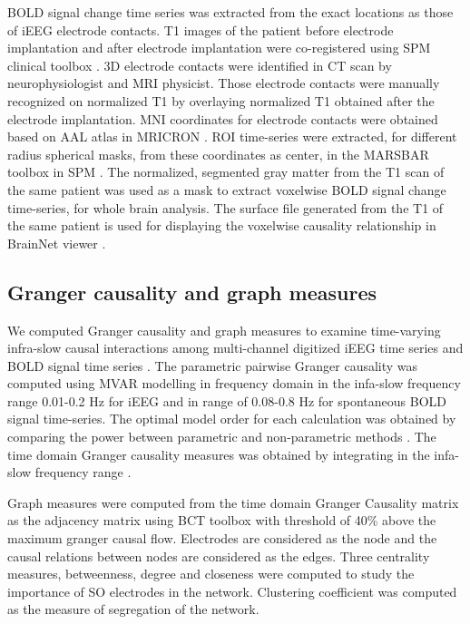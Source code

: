 BOLD signal change time series was extracted from the exact locations as those of iEEG electrode contacts. T1 images of the patient before electrode implantation and after electrode implantation were co-registered using SPM clinical toolbox \citep{rorden2012age}. 3D electrode contacts were identified in CT scan by neurophysiologist and MRI physicist. Those electrode contacts were manually recognized on normalized T1 by overlaying normalized T1 obtained after the electrode implantation. MNI coordinates for electrode contacts were obtained based on AAL atlas in MRICRON  \citep{rorden2000stereotaxic}. ROI time-series were extracted, for different radius spherical masks, from these coordinates as center, in the MARSBAR toolbox in SPM \citep{eickhoff2005new}. The normalized, segmented gray matter from the T1 scan of the same patient was used as a mask to extract voxelwise BOLD signal change time-series, for whole brain analysis. The surface file generated from the T1 of the same patient is used for displaying the voxelwise causality relationship in BrainNet viewer \citep{xia2013brainnet}.

\subsection{Granger causality and graph measures}
We computed Granger causality and graph measures to examine time-varying infra-slow causal interactions among multi-channel digitized iEEG time series and BOLD signal time series \citep{dhamala2008analyzing}. The parametric pairwise Granger causality was computed using MVAR modelling in frequency domain in the infa-slow frequency range 0.01-0.2 Hz for iEEG and in range of 0.08-0.8 Hz for spontaneous BOLD signal time-series. The optimal model order for each calculation was obtained by comparing the power between parametric and non-parametric methods \citep{adhikari2013localizing}. The time domain Granger causality measures was obtained by integrating in the infa-slow frequency range \citep{geweke1982measurement}.

Graph measures were computed from the time domain Granger Causality matrix as the adjacency matrix using BCT toolbox \citep{rubinov2010complex} with threshold of 40\% above the maximum granger causal flow. Electrodes are considered as the node and the causal relations between nodes are considered as the edges. Three centrality measures, betweenness, degree and closeness were computed to study the importance of SO electrodes in the network. Clustering coefficient was computed as the measure of segregation of the network.

